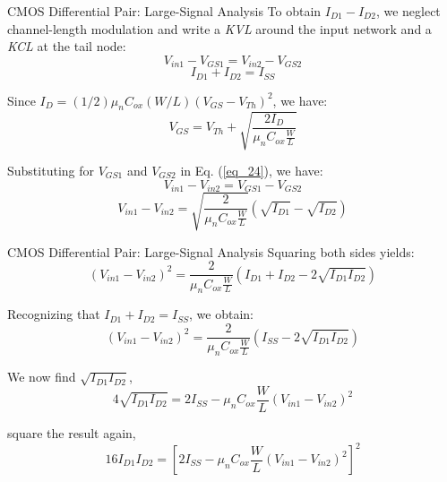 \documentclass[10pt]{beamer}
\begin{document}
\begin{frame}{CMOS Differential Pair: Large-Signal Analysis}
    To obtain $I_{D1} - I_{D2}$, we neglect channel-length modulation and write a \textit{KVL} around the input network and a \textit{KCL} at the tail node:
    \begin{equation}
        V_{in1} - V_{GS1} = V_{in2} - V_{GS2}
        \label{eq_24}
    \end{equation}
    \begin{equation}
        I_{D1} + I_{D2} = I_{SS}
        \label{eq_25}
    \end{equation}
    
    Since $I_{D} = (1/2) \mu_{n} C_{ox} (W/L) (V_{GS} - V_{Th})^{2}$, we have:
    \begin{equation}
        V_{GS} = V_{Th} + \sqrt{\frac{2 I_{D}}{\mu_{n} C_{ox} \frac{W}{L}}}
        \label{eq_26}
    \end{equation}
    
    Substituting for $V_{GS1}$ and $V_{GS2}$ in Eq. (\ref{eq_24}), we have:
    \begin{equation}
        V_{in1} - V_{in2} = V_{GS1} - V_{GS2}
        \label{eq_27}
    \end{equation}
    \begin{equation}
        V_{in1} - V_{in2} = \sqrt{\frac{2}{\mu_{n} C_{ox} \frac{W}{L}}} (\sqrt{I_{D1}} - \sqrt{I_{D2}})
        \label{eq_28}
    \end{equation}
\end{frame}



\begin{frame}{CMOS Differential Pair: Large-Signal Analysis}
    Squaring both sides yields:
    \begin{equation}
        (V_{in1} - V_{in2})^{2} = \frac{2}{\mu_{n} C_{ox} \frac{W}{L}} (I_{D1} + I_{D2} - 2\sqrt{I_{D1}I_{D2}})
        \label{eq_29}
    \end{equation}

    Recognizing that $I_{D1} + I_{D2} = I_{SS}$, we obtain:
    \begin{equation}
        (V_{in1} - V_{in2})^{2} = \frac{2}{\mu_{n} C_{ox} \frac{W}{L}} (I_{SS} - 2\sqrt{I_{D1}I_{D2}})
        \label{eq_30}
    \end{equation}
    
    We now find $\sqrt{I_{D1}I_{D2}}$,
    \begin{equation}
        4\sqrt{I_{D1}I_{D2}} = 2I_{SS} - \mu_{n} C_{ox} \frac{W}{L} (V_{in1} - V_{in2})^{2}
        \label{eq_31}
    \end{equation}
    
    square the result again,
    \begin{equation}
        16I_{D1}I_{D2} = \left[ 2I_{SS} - \mu_{n} C_{ox} \frac{W}{L} (V_{in1} - V_{in2})^{2} \right]^{2}
        \label{eq_32}
    \end{equation}
\end{frame}
\end{document}
